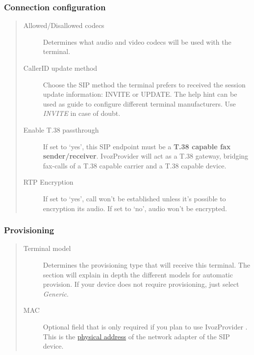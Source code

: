 \documentclass[letterpaper,10pt,english]{sphinxmanual}
\begin{document}
\subsubsection{Connection configuration}
\label{administration_portal/client/vpbx/terminals:connection-configuration}\begin{quote}
\begin{description}
\item[{Allowed/Disallowed codecs}] \leavevmode
Determines what audio and video codecs will be used with the terminal.

\item[{CallerID update method}] \leavevmode
Choose the SIP method the terminal prefers to received the session
update information: INVITE or UPDATE. The help hint can be used as
guide to configure different terminal manufacturers. Use \emph{INVITE} in
case of doubt.

\item[{Enable T.38 passthrough}] \leavevmode
If set to `yes', this SIP endpoint must be a \textbf{T.38 capable fax sender/receiver}. IvozProvider
will act as a T.38 gateway, bridging fax-calls of a T.38 capable carrier and a T.38 capable device.

\item[{RTP Encryption}] \leavevmode
If set to `yes', call won't be established unless it's possible to encryption its audio. If set to `no',
audio won't be encrypted.

\end{description}
\end{quote}


\subsubsection{Provisioning}
\label{administration_portal/client/vpbx/terminals:provisioning}\begin{quote}
\begin{description}
\item[{Terminal model}] \leavevmode
Determines the provisioning type that will receive this terminal.
The section {\hyperref[administration_portal/platform/terminal_manufacturers:provisioning]{}} will explain
in depth the different models for automatic provision. If your device
does not require provisioning, just select \emph{Generic}.

\item[{MAC}] \leavevmode
Optional field that is only required if you plan to use IvozProvider
{\hyperref[administration_portal/platform/terminal_manufacturers:provisioning]{}}. This is the \href{https://wikipedia.org/wiki/MAC\_Address}{physical
address} of the network
adapter of the SIP device.

\end{description}
\end{quote}
\end{document}
